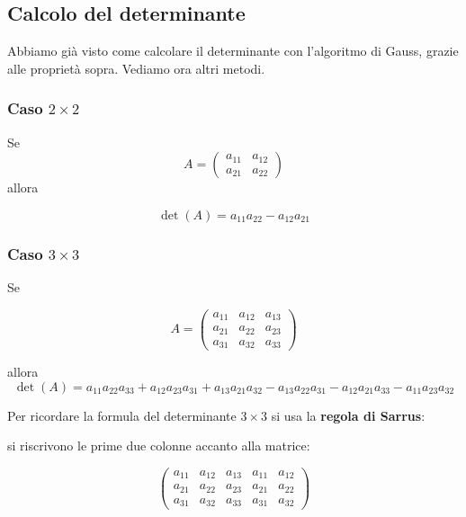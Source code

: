 \documentclass[
  a4paper,
]{article}
\begin{document}
\hypertarget{calcolo-del-determinante}{%
\subsection{Calcolo del determinante}\label{calcolo-del-determinante}}

Abbiamo già visto come calcolare il determinante con l'algoritmo di
Gauss, grazie alle proprietà sopra. Vediamo ora altri metodi.

\hypertarget{caso-2times2}{%
\subsubsection{\texorpdfstring{Caso
\(2\times2\)}{Caso 2\textbackslash times2}}\label{caso-2times2}}

\begin{propositionbox}
Se \[
A=
\begin{pmatrix}
a_{11} & a_{12}\\
a_{21} & a_{22}
\end{pmatrix}
\] allora

\[
\det(A)=a_{11}a_{22}-a_{12}a_{21}
\]
\end{propositionbox}

\hypertarget{caso-3times3}{%
\subsubsection{\texorpdfstring{Caso
\(3\times3\)}{Caso 3\textbackslash times3}}\label{caso-3times3}}

\begin{propositionbox}
Se

\[
A=
\begin{pmatrix}
a_{11} & a_{12} & a_{13}\\
a_{21} & a_{22} & a_{23}\\
a_{31} & a_{32} & a_{33}
\end{pmatrix}
\]

allora \[
\det(A)=
a_{11}a_{22}a_{33}
+a_{12}a_{23}a_{31}
+a_{13}a_{21}a_{32}
-a_{13}a_{22}a_{31}
-a_{12}a_{21}a_{33}
-a_{11}a_{23}a_{32}
\]
\end{propositionbox}

Per ricordare la formula del determinante \(3\times3\) si usa la
\textbf{regola di Sarrus}:

si riscrivono le prime due colonne accanto alla matrice:

\[
\begin{pmatrix}
a_{11} & a_{12} & a_{13} & a_{11} & a_{12}\\
a_{21} & a_{22} & a_{23} & a_{21} & a_{22}\\
a_{31} & a_{32} & a_{33} & a_{31} & a_{32}
\end{pmatrix}
\]
\end{document}
